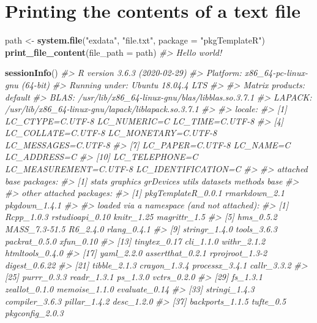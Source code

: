 \documentclass[]{article}
\newenvironment{Shaded}{\begin{snugshade}}{\end{snugshade}}
\newcommand{\CommentTok}[1]{\textcolor[rgb]{0.56,0.35,0.01}{\textit{#1}}}
\newcommand{\DataTypeTok}[1]{\textcolor[rgb]{0.13,0.29,0.53}{#1}}
\newcommand{\KeywordTok}[1]{\textcolor[rgb]{0.13,0.29,0.53}{\textbf{#1}}}
\newcommand{\NormalTok}[1]{#1}
\newcommand{\StringTok}[1]{\textcolor[rgb]{0.31,0.60,0.02}{#1}}
\begin{document}
\hypertarget{printing-the-contents-of-a-text-file}{%
\section{Printing the contents of a text
file}\label{printing-the-contents-of-a-text-file}}

\begin{Shaded}
\begin{Highlighting}[]
\NormalTok{path <-}\StringTok{ }\KeywordTok{system.file}\NormalTok{(}\StringTok{"exdata"}\NormalTok{, }\StringTok{"file.txt"}\NormalTok{,}
                    \DataTypeTok{package =} \StringTok{"pkgTemplateR"}\NormalTok{)}
\KeywordTok{print_file_content}\NormalTok{(}\DataTypeTok{file_path =}\NormalTok{ path)}
\CommentTok{#> Hello world!}
\end{Highlighting}
\end{Shaded}

\newpage

\begin{Shaded}
\begin{Highlighting}[]
\KeywordTok{sessionInfo}\NormalTok{()}
\CommentTok{#> R version 3.6.3 (2020-02-29)}
\CommentTok{#> Platform: x86_64-pc-linux-gnu (64-bit)}
\CommentTok{#> Running under: Ubuntu 18.04.4 LTS}
\CommentTok{#> }
\CommentTok{#> Matrix products: default}
\CommentTok{#> BLAS:   /usr/lib/x86_64-linux-gnu/blas/libblas.so.3.7.1}
\CommentTok{#> LAPACK: /usr/lib/x86_64-linux-gnu/lapack/liblapack.so.3.7.1}
\CommentTok{#> }
\CommentTok{#> locale:}
\CommentTok{#>  [1] LC_CTYPE=C.UTF-8       LC_NUMERIC=C           LC_TIME=C.UTF-8       }
\CommentTok{#>  [4] LC_COLLATE=C.UTF-8     LC_MONETARY=C.UTF-8    LC_MESSAGES=C.UTF-8   }
\CommentTok{#>  [7] LC_PAPER=C.UTF-8       LC_NAME=C              LC_ADDRESS=C          }
\CommentTok{#> [10] LC_TELEPHONE=C         LC_MEASUREMENT=C.UTF-8 LC_IDENTIFICATION=C   }
\CommentTok{#> }
\CommentTok{#> attached base packages:}
\CommentTok{#> [1] stats     graphics  grDevices utils     datasets  methods   base     }
\CommentTok{#> }
\CommentTok{#> other attached packages:}
\CommentTok{#> [1] pkgTemplateR_0.0.1 rmarkdown_2.1      pkgdown_1.4.1     }
\CommentTok{#> }
\CommentTok{#> loaded via a namespace (and not attached):}
\CommentTok{#>  [1] Rcpp_1.0.3       rstudioapi_0.10  knitr_1.25       magrittr_1.5    }
\CommentTok{#>  [5] hms_0.5.2        MASS_7.3-51.5    R6_2.4.0         rlang_0.4.1     }
\CommentTok{#>  [9] stringr_1.4.0    tools_3.6.3      packrat_0.5.0    xfun_0.10       }
\CommentTok{#> [13] tinytex_0.17     cli_1.1.0        withr_2.1.2      htmltools_0.4.0 }
\CommentTok{#> [17] yaml_2.2.0       assertthat_0.2.1 rprojroot_1.3-2  digest_0.6.22   }
\CommentTok{#> [21] tibble_2.1.3     crayon_1.3.4     processx_3.4.1   callr_3.3.2     }
\CommentTok{#> [25] purrr_0.3.3      readr_1.3.1      ps_1.3.0         vctrs_0.2.0     }
\CommentTok{#> [29] fs_1.3.1         zeallot_0.1.0    memoise_1.1.0    evaluate_0.14   }
\CommentTok{#> [33] stringi_1.4.3    compiler_3.6.3   pillar_1.4.2     desc_1.2.0      }
\CommentTok{#> [37] backports_1.1.5  tufte_0.5        pkgconfig_2.0.3}
\end{Highlighting}
\end{Shaded}
\end{document}
